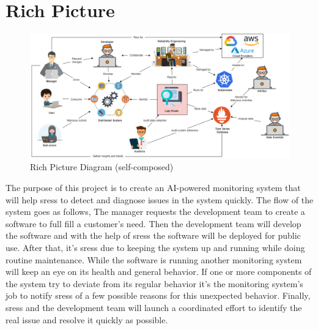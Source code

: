 \section{Rich Picture}

\begin{figure}[H]
    \includegraphics[width=16cm]{assets/requirement-specification/rich-picture.png}
    \caption{Rich Picture Diagram (self-composed)}
    \label{fig:rich-picture}
\end{figure}

The purpose of this project is to create an AI-powered monitoring system that will help \acp{sres} to detect and diagnose issues in the system quickly. The flow of the system goes as follows, The manager requests the development team to create a software to full fill a customer's need. Then the development team will develop the software and with the help of \acp{sres} the software will be deployed for public use. After that, it's \acp{sres} due to keeping the system up and running while doing routine maintenance. While the software is running another monitoring system will keep an eye on its health and general behavior. If one or more components of the system try to deviate from its regular behavior it's the monitoring system's job to notify \acp{sres} of a few possible reasons for this unexpected behavior. Finally, \acp{sres} and the development team will launch a coordinated effort to identify the real issue and resolve it quickly as possible. 